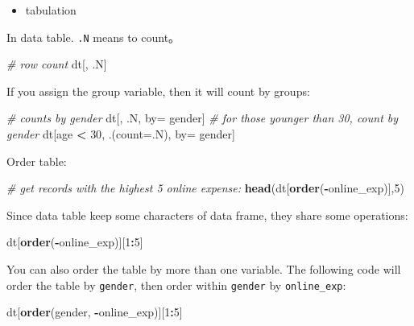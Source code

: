 \documentclass[12pt,]{krantz}
\makeatletter
\newenvironment{Shaded}{\begin{snugshade}}{\end{snugshade}}
\newcommand{\KeywordTok}[1]{\textcolor[rgb]{0.27,0.27,0.27}{\textbf{#1}}}
\newcommand{\DataTypeTok}[1]{\textcolor[rgb]{0.27,0.27,0.27}{#1}}
\newcommand{\DecValTok}[1]{\textcolor[rgb]{0.06,0.06,0.06}{#1}}
\newcommand{\StringTok}[1]{\textcolor[rgb]{0.5,0.5,0.5}{#1}}
\newcommand{\CommentTok}[1]{\textcolor[rgb]{0.37,0.37,0.37}{\textit{#1}}}
\newcommand{\OperatorTok}[1]{\textcolor[rgb]{0.43,0.43,0.43}{\textbf{#1}}}
\newcommand{\NormalTok}[1]{#1}
\providecommand{\tightlist}{%
  \setlength{\itemsep}{0pt}\setlength{\parskip}{0pt}}
\newenvironment{kframe}{%
\medskip{}
\setlength{\fboxsep}{.8em}
 \def\at@end@of@kframe{}%
 \ifinner\ifhmode%
  \def\at@end@of@kframe{\end{minipage}}%
  \begin{minipage}{\columnwidth}%
 \fi\fi%
 \def\FrameCommand##1{\hskip\@totalleftmargin \hskip-\fboxsep
 \colorbox{shadecolor}{##1}\hskip-\fboxsep
     \hskip-\linewidth \hskip-\@totalleftmargin \hskip\columnwidth}%
 \MakeFramed {\advance\hsize-\width
   \@totalleftmargin\z@ \linewidth\hsize
   \@setminipage}}%
 {\par\unskip\endMakeFramed%
 \at@end@of@kframe}
\renewenvironment{Shaded}{\begin{kframe}}{\end{kframe}}
\theoremstyle{definition}
\theoremstyle{definition}
\theoremstyle{definition}
\theoremstyle{remark}
\makeatother
\begin{document}
\begin{itemize}
\tightlist
\item
  tabulation
\end{itemize}

In data table. \texttt{.N} means to count。

\begin{Shaded}
\begin{Highlighting}[]
\CommentTok{# row count}
\NormalTok{dt[, .N] }
\end{Highlighting}
\end{Shaded}

If you assign the group variable, then it will count by groups:

\begin{Shaded}
\begin{Highlighting}[]
\CommentTok{# counts by gender}
\NormalTok{dt[, .N, by=}\StringTok{ }\NormalTok{gender]  }
\CommentTok{# for those younger than 30, count by gender}
\NormalTok{ dt[age }\OperatorTok{<}\StringTok{ }\DecValTok{30}\NormalTok{, .(}\DataTypeTok{count=}\NormalTok{.N), by=}\StringTok{ }\NormalTok{gender] }
\end{Highlighting}
\end{Shaded}

Order table:

\begin{Shaded}
\begin{Highlighting}[]
\CommentTok{# get records with the highest 5 online expense:}
\KeywordTok{head}\NormalTok{(dt[}\KeywordTok{order}\NormalTok{(}\OperatorTok{-}\NormalTok{online_exp)],}\DecValTok{5}\NormalTok{) }
\end{Highlighting}
\end{Shaded}

Since data table keep some characters of data frame, they share some
operations:

\begin{Shaded}
\begin{Highlighting}[]
\NormalTok{dt[}\KeywordTok{order}\NormalTok{(}\OperatorTok{-}\NormalTok{online_exp)][}\DecValTok{1}\OperatorTok{:}\DecValTok{5}\NormalTok{]}
\end{Highlighting}
\end{Shaded}

You can also order the table by more than one variable. The following
code will order the table by \texttt{gender}, then order within
\texttt{gender} by \texttt{online\_exp}:

\begin{Shaded}
\begin{Highlighting}[]
\NormalTok{dt[}\KeywordTok{order}\NormalTok{(gender, }\OperatorTok{-}\NormalTok{online_exp)][}\DecValTok{1}\OperatorTok{:}\DecValTok{5}\NormalTok{]}
\end{Highlighting}
\end{Shaded}
\end{document}
